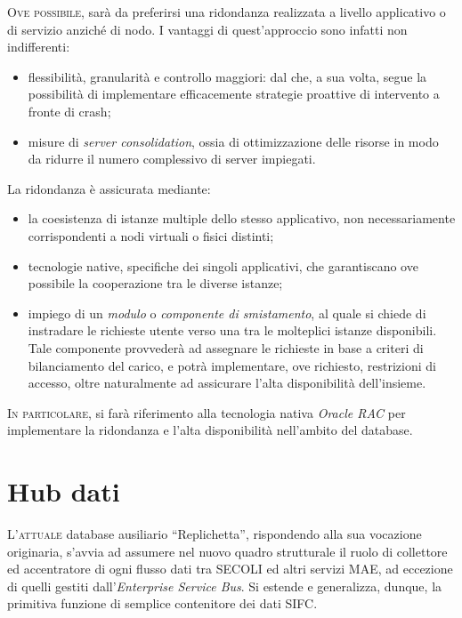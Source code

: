 \documentclass[headinclude,footinclude,a4paper,11pt,final]{scrreprt}
\begin{document}
\lettrine{O}{ve possibile}, sarà da preferirsi una ridondanza realizzata a livello applicativo o di servizio anziché di nodo.  I vantaggi di quest'approccio sono infatti non indifferenti:
\begin{itemize}
\item flessibilità, granularità e controllo maggiori: dal che, a sua volta, segue la possibilità di implementare efficacemente strategie proattive di intervento a fronte di crash;
\item misure di \emph{server consolidation}, ossia di ottimizzazione delle risorse in modo da ridurre il numero complessivo di server impiegati.
\end{itemize}

La ridondanza è assicurata mediante:
\begin{itemize}
\item la coesistenza di istanze multiple dello stesso applicativo, non necessariamente corrispondenti a nodi virtuali o fisici distinti;
\item tecnologie native, specifiche dei singoli applicativi, che garantiscano ove possibile la cooperazione tra le diverse istanze;
\item impiego di un \emph{modulo} o \emph{componente di smistamento}, al quale si chiede di instradare le richieste utente verso una tra le molteplici istanze disponibili.  Tale componente provvederà ad assegnare le richieste in base a criteri di bilanciamento del carico, e potrà implementare, ove richiesto, restrizioni di accesso, oltre naturalmente ad assicurare l'alta disponibilità dell'insieme.
\end{itemize}

\bigskip

\lettrine{I}{n particolare}, si farà riferimento alla tecnologia nativa \emph{Oracle RAC} per implementare la ridondanza e l'alta disponibilità nell'ambito del database.

\section{Hub dati}

\lettrine{L'}{attuale} database ausiliario ``Replichetta'', rispondendo alla sua vocazione originaria, s'avvia ad assumere nel nuovo quadro strutturale il ruolo di collettore ed accentratore di ogni flusso dati tra SECOLI ed altri servizi MAE, ad eccezione di quelli gestiti dall'\emph{Enterprise Service Bus}.  Si estende e generalizza, dunque, la primitiva funzione di semplice contenitore dei dati SIFC.
\end{document}
